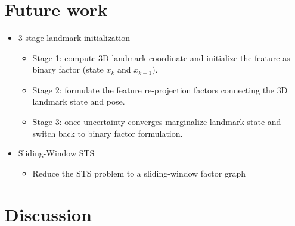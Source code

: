 \documentclass[%
    fourtothree=true, %
    DepLogo=true     %
    ]{ETHpres}
\begin{document}
\clearpage

\ETHslide
\section*{Future work}
\begin{itemize}
	\item[\ETHitem] 3-stage landmark initialization
	\begin{itemize}
		\item Stage 1: compute 3D landmark coordinate and initialize the feature as binary factor (state $x_k$ and $x_{k+1}$).
		\item Stage 2: formulate the feature re-projection factors connecting the 3D landmark state and pose.
		\item Stage 3: once uncertainty converges marginalize landmark state and switch back to binary factor formulation.
	\end{itemize}
 	\item[\ETHitem] Sliding-Window STS
	\begin{itemize}
		\item Reduce the STS problem to a sliding-window factor graph		
	\end{itemize} 	
\end{itemize}

\clearpage

\ETHslide
\section*{Discussion}

\end{document}
